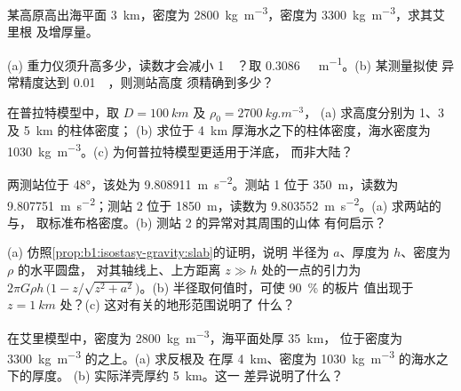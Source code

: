 \begin{exercise}[$\star$]\label{exo:b1:isostasy-gravity:3}
某高原高出海平面 \qty{3}{km}，密度为
\qty{2800}{kg.m^{-3}}，密度为 \qty{3300}{kg.m^{-3}}，求其艾里根
及增厚量。
\end{exercise}

\begin{exercise}[$\star$]\label{exo:b1:isostasy-gravity:4}
(a) 重力仪须升高多少，读数才会减小
\qty{1}{\milli\gal}？取 \qty{0.3086}{\milli\gal.m^{-1}}。(b) 某测量拟使
异常精度达到 \qty{0.01}{\milli\gal}，则测站高度
须精确到多少？
\end{exercise}

\begin{exercise}[$\star\star$]\label{exo:b1:isostasy-gravity:5}
在普拉特模型中，取 $D = \qty{100}{km}$ 及 $\rho_0 = \qty{2700}{kg.m^{-3}}$，
(a) 求高度分别为 1、3 及 \qty{5}{km} 的柱体密度；
(b) 求位于 \qty{4}{km} 厚海水之下的柱体密度，海水密度为
\qty{1030}{kg.m^{-3}}。(c) 为何普拉特模型更适用于洋底，
而非大陆？
\end{exercise}

\begin{exercise}[$\star\star$]\label{exo:b1:isostasy-gravity:6}
两测站位于 \ang{48}，该处为
\qty{9.808911}{m.s^{-2}}。测站 1 位于 \qty{350}{m}，读数为
\qty{9.807751}{m.s^{-2}}；测站 2 位于 \qty{1850}{m}，读数为
\qty{9.803552}{m.s^{-2}}。(a) 求两站的与，
取标准布格密度。(b) 测站 2 的异常对其周围的山体
有何启示？
\end{exercise}

\begin{exercise}[$\star\star$]\label{exo:b1:isostasy-gravity:7}
(a) 仿照\cref{prop:b1:isostasy-gravity:slab}的证明，说明
半径为 $a$、厚度为 $h$、密度为 $\rho$ 的水平圆盘，
对其轴线上、上方距离 $z \gg h$ 处的一点的引力为 $2\pi G\rho h\,\bigl(1 -
z/\sqrt{z^2 + a^2}\bigr)$。(b) 半径取何值时，可使 \qty{90}{\percent} 的板片
值出现于 $z = \qty{1}{km}$ 处？(c) 这对有关的地形范围说明了
什么？
\end{exercise}

\begin{exercise}[$\star\star$]\label{exo:b1:isostasy-gravity:8}
在艾里模型中，密度为 \qty{2800}{kg.m^{-3}}，海平面处厚 \qty{35}{km}，
位于密度为 \qty{3300}{kg.m^{-3}} 的之上。(a) 求反根及
在厚 \qty{4}{km}、密度为 \qty{1030}{kg.m^{-3}} 的海水之下的厚度。
(b) 实际洋壳厚约 \qty{5}{km}。这一
差异说明了什么？%
\end{exercise}

